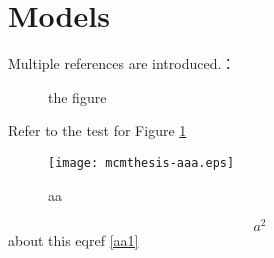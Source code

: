 
\section{Models}
Multiple references are introduced.：\cite{1,2,3}

\begin{figure}[htbp]
	\centering        %
	\caption{the figure} %
	\label{fig:123}      %
\end{figure}

Refer to the test for Figure \ref{fig:123}


\begin{figure}[h]
	\small
	\centering
	\texttt{[image: mcmthesis-aaa.eps]}
	\caption{aa} \label{fig:aa}
\end{figure}





\begin{equation}
a^2 \label{aa1}
\end{equation}
about this eqref \eqref{aa1}

